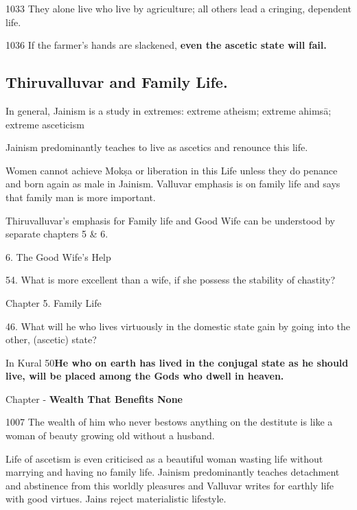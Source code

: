 1033 They alone live who live by agriculture; all others lead a cringing, dependent life.

1036  If the farmer's hands are slackened, \textbf{even the ascetic state will fail.}


\subsection*{Thiruvalluvar and Family Life.}

In general, Jainism is a study in extremes: extreme atheism; extreme ahimsā; extreme asceticism

Jainism predominantly teaches to live as ascetics and renounce this life.

Women cannot achieve Mokṣa or liberation in this Life unless they do penance and born again as male in Jainism. Valluvar emphasis is on family life and says that family man is more important.

Thiruvalluvar’s emphasis for Family life and Good Wife can be understood by separate chapters 5 \& 6.

6. The Good Wife’s Help

54. What is more excellent than a wife, if she possess the stability of chastity?

Chapter 5. Family Life

46. What will he who lives virtuously in the domestic state gain by going into the other, (ascetic) state?

In Kural 50\textbf{He who on earth has lived in the conjugal state as he should live, will be placed among the Gods who dwell in heaven.}

Chapter - \textbf{Wealth That Benefits None}

1007 The wealth of him who never bestows anything on the destitute is like a woman of beauty growing old without a husband.

Life of ascetism is even criticised as a beautiful woman wasting life without marrying and having no family life. Jainism predominantly teaches detachment and abstinence from this worldly pleasures and Valluvar writes for earthly life with good virtues. Jains reject materialistic lifestyle.


